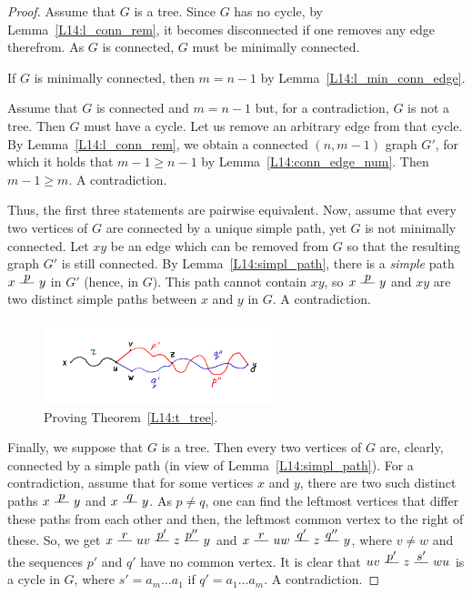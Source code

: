 \documentclass[12pt,notitlepage]{article}
\theoremstyle{plain}
\theoremstyle{definition}
\theoremstyle{plain}
\newcommand{\1}{\mathbf{1}}
\newcommand{\0}{\mathbf{0}}
\newcommand{\pth}[1]{\overset{\raisebox{0.25em}{$ #1 $}}{\relbar\hspace{-.8mm}\relbar}}
\begin{document}
\begin{proof}
	Assume that $G$ is a tree. Since $G$ has no cycle, by Lemma~\ref{L14:l_conn_rem}, it becomes disconnected if one removes any edge therefrom. As $G$ is connected, $G$ must be minimally connected.
	
	If $G$ is minimally connected, then $m = n - 1$ by Lemma~\ref{L14:l_min_conn_edge}.
	
	Assume that $G$ is connected and $m = n - 1$ but, for a contradiction, $G$ is not a tree. Then $G$ must have a cycle. Let us remove an arbitrary edge from that cycle. By Lemma~\ref{L14:l_conn_rem}, we obtain a connected $(n, m - 1)$ graph $G'$, for which it holds that $m - 1 \geq n - 1$ by Lemma~\ref{L14:conn_edge_num}. Then $m - 1 \geq m$. A contradiction.
	
	Thus, the first three statements are pairwise equivalent. Now, assume that every two vertices of $G$ are connected by a unique simple path, yet $G$ is not minimally connected. Let $x y$ be an edge which can be removed from $G$ so that the resulting graph $G'$ is still connected. By Lemma~\ref{L14:simpl_path}, there is a \emph{simple} path $x \pth{p} y$ in $G'$ (hence, in $G$). This path cannot contain $xy$, so $x \pth{p} y$ and $x y$ are two distinct simple paths between $x$ and $y$ in $G$. A contradiction.
	
	\begin{figure}[h]
		\centering
		\includegraphics*[width=0.60\textwidth]{graph_tree_def.pdf}
		\caption{Proving Theorem~\ref{L14:t_tree}.}
	\end{figure}
	
	
	Finally, we suppose that $G$ is a tree. Then every two vertices of $G$ are, clearly, connected by a simple path (in view of Lemma~\ref{L14:simpl_path}). For a contradiction, assume that for some vertices $x$ and $y$, there are two such distinct paths $x \pth{p} y$ and $x \pth{q} y$. As $p \neq q$, one can find the leftmost vertices that differ these paths from each other and then, the leftmost common vertex to the right of these. So, we get $x \pth{r} u v \pth{p'} z \pth{p''} y$ and $x \pth{r} u w \pth{q'} z \pth{q''} y$, where $v \neq w$ and the sequences $p'$ and $q'$ have no common vertex. It is clear that $u v \pth{p'} z \pth{s'} w u$ is a cycle in $G$, where $s' = a_m \ldots a_1$ if $q' = a_1 \ldots a_m$. A contradiction.
\end{proof}
\end{document}
